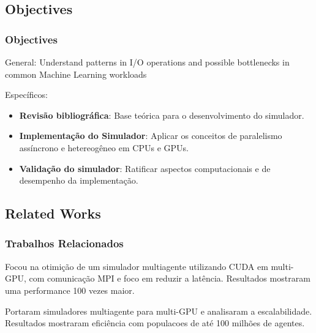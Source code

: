 \documentclass[brazil, bsc, 10pt]{beamer}
\begin{document}
\subsection{Objectives}

\begin{frame}
	\frametitle{Objectives}
	\begin{block}{General:}
        Understand \alert{patterns in I/O operations and possible bottlenecks} in common
        Machine Learning workloads
	\end{block}
	\begin{block}{Específicos:}
		\begin{itemize}
			\item \textbf{Revisão bibliográfica}: Base teórica para o desenvolvimento do simulador.
			\item \textbf{Implementação do Simulador}: Aplicar os conceitos de paralelismo assíncrono e hetereogêneo em CPUs e GPUs.
			\item \textbf{Validação do simulador}: Ratificar \alert{aspectos computacionais e de desempenho} da implementação.
		\end{itemize}
	\end{block}
\end{frame}

\subsection{Related Works}

\begin{frame}
	\frametitle{Trabalhos Relacionados}
	\begin{block}{}
		Focou na otimição de um simulador multiagente utilizando CUDA em multi-GPU, com comunicação MPI e foco em reduzir a latência. Resultados mostraram uma performance 100 vezes maior.
	\end{block}

	\begin{block}{}
		Portaram simuladores multiagente para multi-GPU e analisaram a escalabilidade. Resultados mostraram eficiência com populacoes de até 100 milhões de agentes.
	\end{block}
\end{frame}
\end{document}
